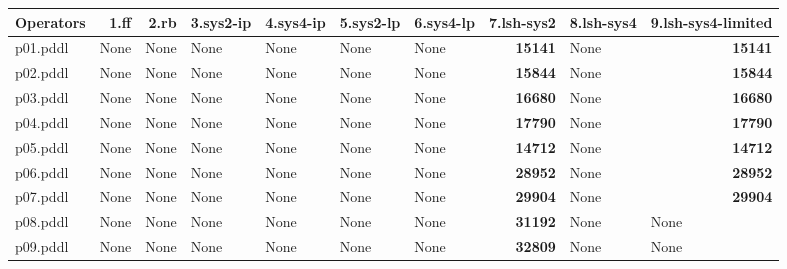 \documentclass{article}
\begin{document}
\begin{tabular}{@{}lrrrrrrrrr@{}}
Operators & 1.ff & 2.rb & 3.sys2-ip & 4.sys4-ip & 5.sys2-lp & 6.sys4-lp & 7.lsh-sys2 & 8.lsh-sys4 & 9.lsh-sys4-limited \\
\midrule
p01.pddl & \multicolumn{1}{|l|}{None} & \multicolumn{1}{|l|}{None} & \multicolumn{1}{|l|}{None} & \multicolumn{1}{|l|}{None} & \multicolumn{1}{|l|}{None} & \multicolumn{1}{|l|}{None} & \textbf{15141} & \multicolumn{1}{|l|}{None} & \textbf{15141} \\
p02.pddl & \multicolumn{1}{|l|}{None} & \multicolumn{1}{|l|}{None} & \multicolumn{1}{|l|}{None} & \multicolumn{1}{|l|}{None} & \multicolumn{1}{|l|}{None} & \multicolumn{1}{|l|}{None} & \textbf{15844} & \multicolumn{1}{|l|}{None} & \textbf{15844} \\
p03.pddl & \multicolumn{1}{|l|}{None} & \multicolumn{1}{|l|}{None} & \multicolumn{1}{|l|}{None} & \multicolumn{1}{|l|}{None} & \multicolumn{1}{|l|}{None} & \multicolumn{1}{|l|}{None} & \textbf{16680} & \multicolumn{1}{|l|}{None} & \textbf{16680} \\
p04.pddl & \multicolumn{1}{|l|}{None} & \multicolumn{1}{|l|}{None} & \multicolumn{1}{|l|}{None} & \multicolumn{1}{|l|}{None} & \multicolumn{1}{|l|}{None} & \multicolumn{1}{|l|}{None} & \textbf{17790} & \multicolumn{1}{|l|}{None} & \textbf{17790} \\
p05.pddl & \multicolumn{1}{|l|}{None} & \multicolumn{1}{|l|}{None} & \multicolumn{1}{|l|}{None} & \multicolumn{1}{|l|}{None} & \multicolumn{1}{|l|}{None} & \multicolumn{1}{|l|}{None} & \textbf{14712} & \multicolumn{1}{|l|}{None} & \textbf{14712} \\
p06.pddl & \multicolumn{1}{|l|}{None} & \multicolumn{1}{|l|}{None} & \multicolumn{1}{|l|}{None} & \multicolumn{1}{|l|}{None} & \multicolumn{1}{|l|}{None} & \multicolumn{1}{|l|}{None} & \textbf{28952} & \multicolumn{1}{|l|}{None} & \textbf{28952} \\
p07.pddl & \multicolumn{1}{|l|}{None} & \multicolumn{1}{|l|}{None} & \multicolumn{1}{|l|}{None} & \multicolumn{1}{|l|}{None} & \multicolumn{1}{|l|}{None} & \multicolumn{1}{|l|}{None} & \textbf{29904} & \multicolumn{1}{|l|}{None} & \textbf{29904} \\
p08.pddl & \multicolumn{1}{|l|}{None} & \multicolumn{1}{|l|}{None} & \multicolumn{1}{|l|}{None} & \multicolumn{1}{|l|}{None} & \multicolumn{1}{|l|}{None} & \multicolumn{1}{|l|}{None} & \textbf{31192} & \multicolumn{1}{|l|}{None} & \multicolumn{1}{|l|}{None} \\
p09.pddl & \multicolumn{1}{|l|}{None} & \multicolumn{1}{|l|}{None} & \multicolumn{1}{|l|}{None} & \multicolumn{1}{|l|}{None} & \multicolumn{1}{|l|}{None} & \multicolumn{1}{|l|}{None} & \textbf{32809} & \multicolumn{1}{|l|}{None} & \multicolumn{1}{|l|}{None} \\

\end{tabular}
\end{document}
